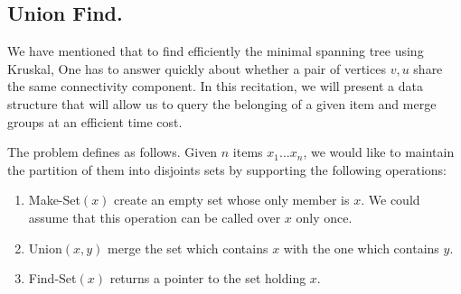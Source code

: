 {}

\def\LinkedList#1{%
  \foreach \element in \list {
    \node[node of list, right = of aux, name=ele] {\element};
    \draw[link] (aux) -- (ele);
    \coordinate (aux) at (ele.east);
  } 
}








\subsection{Union Find.} 

We have mentioned that to find efficiently the minimal spanning tree using Kruskal, One has to answer quickly about whether a pair of vertices $v,u$ share the same connectivity component. In this recitation, we will present a data structure that will allow us to query the belonging of a given item and merge groups at an efficient time cost. 

The problem defines as follows. Given $n$ items $x_1 ... x_{n}$, we would like to maintain the partition of them into disjoints sets by supporting the following operations:  
\begin{enumerate}
  \item Make-Set$(x)$ create an empty set whose only member is $x$. We could assume that this operation can be called over $x$ only once. 
  \item Union$(x,y)$ merge the set which contains $x$ with the one which contains $y$. 
  \item Find-Set$(x)$ returns a pointer to the set holding $x$. 
\end{enumerate}

